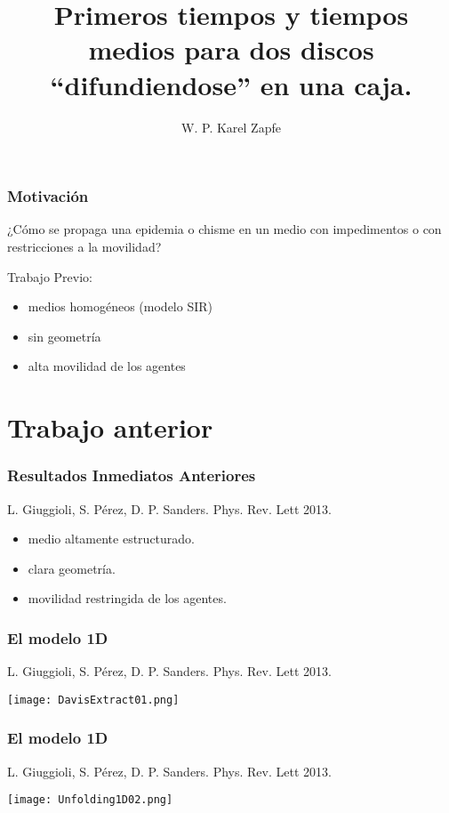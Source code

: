 \documentclass[mathserif,serif]{beamer}
\title{Primeros tiempos y tiempos medios para dos discos
``difundiendose'' en una caja.}
\author[W.P. K.Zapfe]
{W. P. Karel Zapfe\inst{}}
\institute[UNAM]
{
  \inst{}%
  Facultad de Ciencias\\
  U.N.A.M.  
}
\begin{document}
\frame{\titlepage}


  \begin{frame}
    \frametitle{Motivación}
    ¿Cómo se propaga una epidemia o chisme en un medio 
    con impedimentos o con restricciones a la movilidad?
   
    \vspace{10pt}
    
    Trabajo Previo:
    \begin{itemize}
      \item medios homogéneos (modelo SIR)
      \item sin geometría
      \item alta movilidad de los agentes
    \end{itemize}
    
  \end{frame}

\section{Trabajo anterior}

  \begin{frame}
    \frametitle{Resultados Inmediatos Anteriores}
    L. Giuggioli, S. Pérez, D. P. Sanders. Phys. Rev. Lett 2013.
   
    \vspace{10pt}
 
    \begin{itemize}
      \item medio altamente estructurado.
      \item clara geometría.
      \item movilidad restringida de los agentes.
    \end{itemize}   

  \end{frame}


  \begin{frame}
    \frametitle{El modelo 1D}
    L. Giuggioli, S. Pérez, D. P. Sanders. Phys. Rev. Lett 2013.
  
    \centering
    \texttt{[image: DavisExtract01.png]}

  \end{frame}


  \begin{frame}
    \frametitle{El modelo 1D}
    L. Giuggioli, S. Pérez, D. P. Sanders. Phys. Rev. Lett 2013.
  
    \centering
    \texttt{[image: Unfolding1D02.png]}
  \end{frame}
\end{document}
